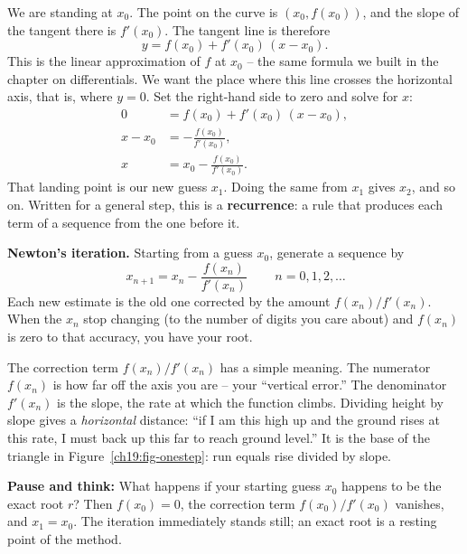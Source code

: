 We are standing at $x_0$. The point on the curve is $(x_0, f(x_0))$, and the slope
of the tangent there is $f'(x_0)$. The tangent line is therefore
\[
  y = f(x_0) + f'(x_0)\,(x - x_0).
\]
This is the linear approximation of $f$ at $x_0$ -- the same
formula we built in the chapter on differentials. We want the place where this line
crosses the horizontal axis, that is, where $y = 0$. Set the right-hand side to zero
and solve for $x$:
\begin{align*}
  0 &= f(x_0) + f'(x_0)\,(x - x_0),\\
  x - x_0 &= -\frac{f(x_0)}{f'(x_0)},\\
  x &= x_0 - \frac{f(x_0)}{f'(x_0)}.
\end{align*}
That landing point is our new guess $x_1$. Doing the same from $x_1$ gives $x_2$,
and so on. Written for a general step, this is a \textbf{recurrence}: a rule that
produces each term of a sequence from the one before it.

\begin{focusbox}
\textbf{Newton's iteration.} Starting from a guess $x_0$, generate a sequence by
\[
  \boxed{\,x_{n+1} = x_n - \dfrac{f(x_n)}{f'(x_n)}\,}
  \qquad n = 0, 1, 2, \ldots
\]
Each new estimate is the old one corrected by the amount $f(x_n)/f'(x_n)$. When the
$x_n$ stop changing (to the number of digits you care about) and $f(x_n)$ is
zero to that accuracy, you have your root.
\end{focusbox}

The correction term $f(x_n)/f'(x_n)$ has a simple meaning. The numerator
$f(x_n)$ is how far off the axis you are -- your ``vertical error.'' The denominator
$f'(x_n)$ is the slope, the rate at which the function climbs. Dividing height by
slope gives a \emph{horizontal} distance: ``if I am this high up and the ground
rises at this rate, I must back up this far to reach ground level.'' It is the
base of the triangle in Figure~\ref{ch19:fig-onestep}: run equals rise divided by
slope.

\textbf{Pause and think:} What happens if your starting guess $x_0$ happens to be
the exact root $r$? Then $f(x_0) = 0$, the correction term $f(x_0)/f'(x_0)$
vanishes, and $x_1 = x_0$. The iteration immediately stands still; an exact root
is a resting point of the method.


